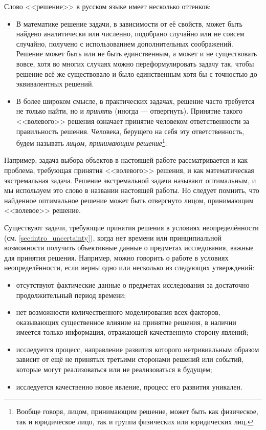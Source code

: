 Слово <<решение>> в русском языке имеет несколько оттенков: 
\begin{itemize}
  \item В математике решение задачи, в зависимости от её свойств, может быть найдено аналитически или численно, подобрано случайно или не совсем случайно, получено с использованием дополнительных соображений. Решение может быть или не быть единственным, а может и не существовать вовсе,  хотя во многих случаях можно переформулировать задачу так, чтобы решение всё же существовало и было единственным хотя бы с точностью до эквивалентных решений. 
  \item В более широком смысле, в практических задачах, решение часто требуется не только найти, но и {\sl принять} (иногда --- отвергнуть). Принятие такого <<волевого>> решения означает принятие человеком ответственности за  правильность решения. Человека, берущего на себя эту ответственность, будем называть {\sl лицом, принимающим решение}\footnote{Вообще говоря, лицом, принимающим решение, может быть как физическое, так и юридическое лицо, так и группа физических или юридических лиц.}. 
\end{itemize}
Например, задача выбора объектов в настоящей работе рассматривается и как проблема, требующая принятия <<волевого>> решения, и как математическая экстремальная задача. Решение экстремальной задачи называют оптимальным, и мы используем это слово в названии настоящей работы. Но следует помнить, что найденное оптимальное решение может быть отвергнуто лицом, принимающим <<волевое>> решение.

Существуют задачи, требующие принятия решения в условиях неопределённости (см. \ref{sec:intro_uncertainty}), когда нет времени или принципиальной возможности получить объективные данные о предметах исследования, важные для принятия решения. Например, можно говорить о работе в условиях неопределённости, если верны одно или несколько из следующих утверждений:
\begin{itemize}
 \item отсутствуют фактические данные о предметах исследования за достаточно продолжительный период времени; 
 \item нет возможности количественного моделирования всех факторов, оказывающих существенное влияние на принятие решения, в наличии имеется только информация, отражающей качественную сторону явлений; 
 \item исследуется процесс, направление развития которого нетривиальным образом зависит от ещё не принятых третьими сторонами решений или событий, которые могут реализоваться или не реализоваться в будущем;
 \item исследуется качественно новое явление, процесс его развития уникален.
\end{itemize}


